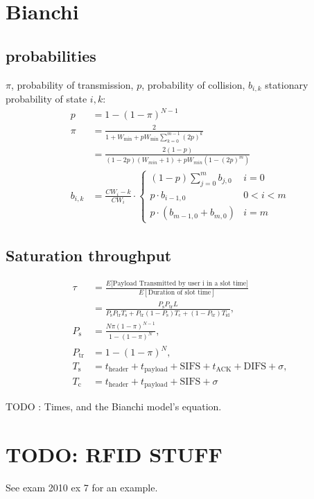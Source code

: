 \documentclass[10pt, a4paper,twocolumn]{scrartcl}
\begin{document}
\section{Bianchi}

\subsection{probabilities}
$\pi$, probability of transmission, $p$, probability of collision,
$b_{i,k}$ stationary probability of state $i,k$:
\begin{align*}
p &= 1-(1-\pi)^{N-1} \\
\pi &= \frac{2}{ 1 + W_\textrm{min} + pW_\textrm{min}\sum^{m-1}_{k=0}(2p)^k}\\
	 &= \frac{2(1-p)}{(1-2p)(W_{min} + 1)+pW_{min}(1-(2p)^m)}\\
b_{i,k} &= \frac{CW_i - k}{CW_i} \cdot \left \{ \begin{array}{ll}
    (1-p) \sum_{j=0}^m b_{j,0} & i = 0\\
    p \cdot b_{i-1,0} & 0 < i < m\\
    p \cdot (b_{m-1,0} + b_{m,0}) & i = m
    \end{array} \right.
\end{align*}

\subsection{Saturation throughput}

\begin{align*}
 \tau &= \frac{E\lbrack\textrm{Payload Transmitted by user i in a slot time}\rbrack}{E[\textrm{Duration of slot time}]} \\ 
 &= \frac{P_\textrm{s}P_{\textrm{tr}}L}{P_\textrm{s}P_{\textrm{tr}}T_{\textrm{s}} + P_\textrm{tr}(1-P_\textrm{s})T_\textrm{c} + (1-P_\textrm{tr})T_\textrm{id}}, \\
 P_\textrm{s} &= \frac{N\pi (1-\pi)^{N-1}}{1-(1-\pi)^N}, \\
 P_\textrm{tr} &= 1-(1-\pi)^N, \\
 T_\textrm{s} &= t_\textrm{header} + t_\textrm{payload} + \textrm{SIFS} + t_\textrm{ACK} + \textrm{DIFS} + \sigma,\\
 T_\textrm{c} &= t_\textrm{header} + t_\textrm{payload} + \textrm{SIFS} + \sigma
\end{align*}

TODO : Times, and the Bianchi model's equation.

\section{TODO: RFID STUFF}
See exam 2010  ex 7 for an example.
\end{document}
